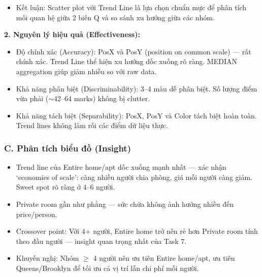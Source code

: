 \begin{itemize}
\begin{itemize}
        \item Ưu tiên 3 -- Đường xu hướng (Trend Line --- superimposed): Mặc dù Trend Line không phải một kênh thị giác theo định nghĩa Mackinlay, đây là lớp thông tin bổ sung (superimposed) quan trọng về mặt thiết kế. Trend Line mã hóa hướng và độ dốc của mối quan hệ giữa Accommodates và Price/person --- thuộc tính mà Position điểm rời rạc không thể truyền tải rõ ràng khi dữ liệu có noise. Đường xu hướng dốc xuống của Entire home/apt và đường gần phẳng của Private room trực tiếp minh họa insight economies of scale, phục vụ task discover (phát hiện xu hướng) mà không yêu cầu người xem tự suy diễn từ đám mây điểm.
    \end{itemize}
    \item Kết luận: Scatter plot với Trend Line là lựa chọn chuẩn mực để phân tích mối quan hệ giữa 2 biến Q và so sánh xu hướng giữa các nhóm.
\end{itemize}

\textbf{2. Nguyên lý hiệu quả (Effectiveness):}

\begin{itemize}
    \item Độ chính xác (Accuracy): PosX và PosY (position on common scale) --- rất chính xác. Trend Line thể hiện xu hướng dốc xuống rõ ràng. MEDIAN aggregation giúp giảm nhiễu so với raw data.
    \item Khả năng phân biệt (Discriminability): 3--4 màu dễ phân biệt. Số lượng điểm vừa phải ($\sim$42--64 marks) không bị clutter.
    \item Khả năng tách biệt (Separability): PosX, PosY và Color tách biệt hoàn toàn. Trend lines không làm rối các điểm dữ liệu thực.
\end{itemize}

\subsubsection*{C. Phân tích biểu đồ (Insight)}

\begin{itemize}
    \item Trend line của Entire home/apt dốc xuống mạnh nhất --- xác nhận `economies of scale': càng nhiều người chia phòng, giá mỗi người càng giảm. Sweet spot rõ ràng ở 4--6 người.
    \item Private room gần như phẳng --- sức chứa không ảnh hưởng nhiều đến price/person.
    \item Crossover point: Với 4+ người, Entire home trở nên rẻ hơn Private room tính theo đầu người --- insight quan trọng nhất của Task 7.
    \item Khuyến nghị: Nhóm $\geq$ 4 người nên ưu tiên Entire home/apt, ưu tiên Queens/Brooklyn để tối ưu cả vị trí lẫn chi phí mỗi người.
\end{itemize}
